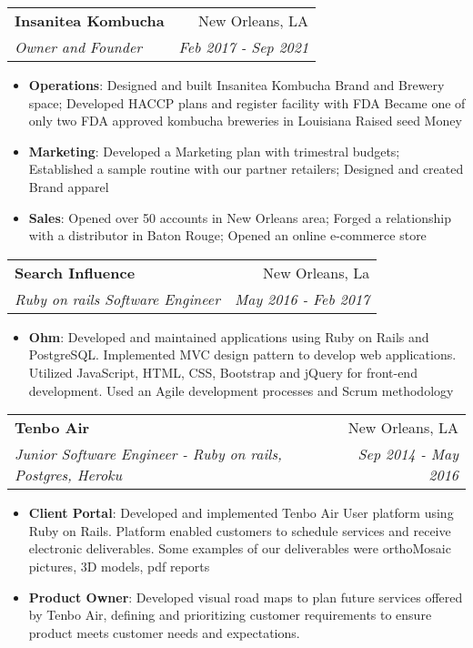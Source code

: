\documentclass[letterpaper,11pt]{article}
\makeatletter
\newcommand{\resumeItem}[2]{
  \item\small{
    \textbf{#1}{: #2 \vspace{-2pt}}
  }
}
\newcommand{\resumeSubheading}[4]{
  \vspace{-1pt}\item
    \begin{tabular*}{0.97\textwidth}[t]{l@{\extracolsep{\fill}}r}
      \textbf{#1} & #2 \\
      \textit{\small#3} & \textit{\small #4} \\
    \end{tabular*}\vspace{-5pt}
}
\newcommand{\resumeSubSubheading}[2]{
    \begin{tabular*}{0.97\textwidth}{l@{\extracolsep{\fill}}r}
      \textit{\small#1} & \textit{\small #2} \\
    \end{tabular*}\vspace{-5pt}
}
\newcommand{\resumeSubHeadingListEnd}{\end{itemize}}
\newcommand{\resumeItemListStart}{\begin{itemize}}
\newcommand{\resumeItemListEnd}{\end{itemize}\vspace{-5pt}}
\makeatother
\begin{document}

    \resumeSubheading
      {Insanitea Kombucha}{New Orleans, LA}
      {Owner and Founder}{Feb 2017 - Sep 2021}
      \resumeItemListStart
        \resumeItem{Operations}
          {Designed and built Insanitea Kombucha Brand and Brewery space; Developed HACCP plans and register facility with FDA} {Became one of only two FDA approved kombucha breweries in Louisiana} {Raised seed Money}
        \resumeItem{Marketing}
          {Developed a Marketing plan with trimestral budgets; Established a sample routine with our partner retailers;} {Designed and created Brand apparel }
        \resumeItem{Sales}
          {Opened over 50 accounts in New Orleans area; Forged a relationship with a distributor in Baton Rouge; }{Opened an online e-commerce store}        
      \resumeItemListEnd

    \resumeSubheading
      {Search Influence}{New Orleans, La}
      {Ruby on rails Software Engineer}{May 2016 - Feb 2017}
      \resumeItemListStart
        \resumeItem{Ohm}
          {Developed and maintained applications using Ruby on Rails and PostgreSQL. Implemented MVC design pattern to develop web applications. Utilized JavaScript, HTML, CSS, Bootstrap and jQuery for front-end development. Used an Agile development processes and Scrum methodology}
                 
      \resumeItemListEnd

    \resumeSubheading
      {Tenbo Air}{New Orleans, LA}
      { Junior Software Engineer - Ruby on rails, Postgres, Heroku }{Sep 2014 - May 2016}
      \resumeItemListStart
        \resumeItem{Client Portal}
          {Developed and implemented Tenbo Air User platform using Ruby on Rails. Platform enabled customers to schedule services and receive electronic deliverables. Some examples of our deliverables were orthoMosaic pictures, 3D models, pdf reports }
        \resumeItem{ Product Owner}
          {Developed visual road maps to plan future services offered by Tenbo Air, defining and prioritizing customer requirements to ensure product meets customer needs and expectations.}
      \resumeItemListEnd
\end{document}
